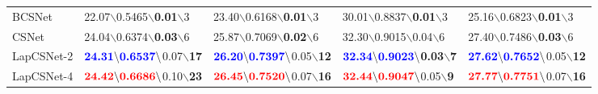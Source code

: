 \documentclass{article}
\begin{document}
\begin{table*}[!t]
\begin{small}
\begin{tabular}{>{\hfil}p{55pt}<{\hfil}|>{\hfil}p{98pt}<{\hfil}|>{\hfil}p{98pt}<{\hfil}|
    >{\hfil}p{98pt}<{\hfil}|>{\hfil}p{98pt}<{\hfil}}
BCSNet~\cite{adler2016deep}            & 22.07$\backslash$0.5465$\backslash$\textbf{\color{red}0.01}$\backslash$3	&	23.40$\backslash$0.6168$\backslash$\textbf{\color{red}0.01}$\backslash$3	& 30.01$\backslash$0.8837$\backslash$\textbf{\color{red}0.01}$\backslash$3    &  25.16$\backslash$0.6823$\backslash$\textbf{\color{red}0.01}$\backslash$3  	  \\


    CSNet~\cite{shi2017deep}             & 24.04$\backslash$0.6374$\backslash$\textbf{\color{blue}0.03}$\backslash$6	&	25.87$\backslash$0.7069$\backslash$\textbf{\color{blue}0.02}$\backslash$6	& 32.30$\backslash$0.9015$\backslash$0.04$\backslash$6    &  27.40$\backslash$0.7486$\backslash$\textbf{\color{blue}0.03}$\backslash$6  	  \\
LapCSNet-2           & $\textbf{\color{blue}24.31}\backslash\textbf{\color{blue}0.6537}\backslash$0.07$\backslash$\textbf{\color{blue}17}    &   $\textbf{\color{blue}26.20}\backslash\textbf{\color{blue}0.7397}\backslash$0.05$\backslash$\textbf{\color{blue}12}  & $\textbf{\color{blue}32.34}\backslash\textbf{\color{blue}0.9023}\backslash$\textbf{\color{blue}0.03}$\backslash$\textbf{\color{blue}7}    &  $\textbf{\color{blue}27.62}\backslash\textbf{\color{blue}0.7652}\backslash$0.05$\backslash$\textbf{\color{blue}12}     \\

LapCSNet-4           &   $\textbf{\color{red}24.42}\backslash\textbf{\color{red}0.6686}\backslash$0.10$\backslash$\textbf{\color{red}23}  &  $\textbf{\color{red}26.45}\backslash\textbf{\color{red}0.7520}\backslash$0.07$\backslash$\textbf{\color{red}16}   & $\textbf{\color{red}32.44}\backslash\textbf{\color{red}0.9047}\backslash$0.05$\backslash$\textbf{\color{red}9}    &  $\textbf{\color{red}27.77}\backslash\textbf{\color{red}0.7751}\backslash$0.07$\backslash$\textbf{\color{red}16}     \\

    \hline
    \end{tabular}
    \end{small}
\end{table*}
\end{document}
